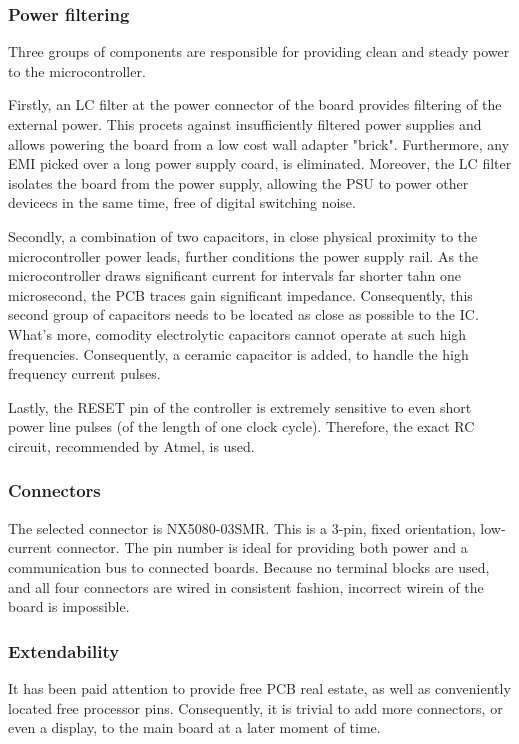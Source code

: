 \subsubsection{Power filtering}
Three groups of components are responsible for providing clean and steady power to the microcontroller.
\par
Firstly, an LC filter at the power connector of the board provides filtering of the external power.
This procets against insufficiently filtered power supplies and allows powering the board from a low cost wall adapter "brick".
Furthermore, any EMI picked over a long power supply coard, is eliminated.
Moreover, the LC filter isolates the board from the power supply, allowing the PSU to power other devicecs in the same time, free of digital switching noise.
\par
Secondly, a combination of two capacitors, in close physical proximity to the microcontroller power leads, further conditions the power supply rail.
As the microcontroller draws significant current for intervals far shorter tahn one microsecond, the PCB traces gain significant impedance.
Consequently, this second group of capacitors needs to be located as close as possible to the IC.
What's more, comodity electrolytic capacitors cannot operate at such high frequencies.
Consequently, a ceramic capacitor is added, to handle the high frequency current pulses.

Lastly, the RESET pin of the controller is extremely sensitive to even short power line pulses (of the length of one clock cycle).
Therefore, the exact RC circuit, recommended by Atmel, is used.

\subsubsection{Connectors}
The selected connector  is NX5080-03SMR.
This is a 3-pin, fixed orientation, low-current connector.
The pin number is ideal for providing both power and a communication bus to connected boards.
Because no terminal blocks are used, and all four connectors are wired in consistent fashion, incorrect wirein of the board is impossible.

\subsubsection{Extendability}
It has been paid attention to provide free PCB real estate, as well as conveniently located free processor pins.
Consequently, it is trivial to add more connectors, or even a display, to the main board at a later moment of time.
